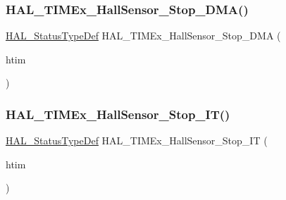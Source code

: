 \subsubsection{\texorpdfstring{H\+A\+L\+\_\+\+T\+I\+M\+Ex\+\_\+\+Hall\+Sensor\+\_\+\+Stop\+\_\+\+D\+M\+A()}{HAL\_TIMEx\_HallSensor\_Stop\_DMA()}}
{\footnotesize\ttfamily \hyperlink{stm32f4xx__hal__def_8h_a63c0679d1cb8b8c684fbb0632743478f}{H\+A\+L\+\_\+\+Status\+Type\+Def} H\+A\+L\+\_\+\+T\+I\+M\+Ex\+\_\+\+Hall\+Sensor\+\_\+\+Stop\+\_\+\+D\+MA (\begin{DoxyParamCaption}\item[{\hyperlink{struct_t_i_m___handle_type_def}{T\+I\+M\+\_\+\+Handle\+Type\+Def} $\ast$}]{htim }\end{DoxyParamCaption})}

\mbox{\label{group___t_i_m_ex___exported___functions___group1_gac6ab7ab0cada425a8d4deb637bd2ad71}} 
\subsubsection{\texorpdfstring{H\+A\+L\+\_\+\+T\+I\+M\+Ex\+\_\+\+Hall\+Sensor\+\_\+\+Stop\+\_\+\+I\+T()}{HAL\_TIMEx\_HallSensor\_Stop\_IT()}}
{\footnotesize\ttfamily \hyperlink{stm32f4xx__hal__def_8h_a63c0679d1cb8b8c684fbb0632743478f}{H\+A\+L\+\_\+\+Status\+Type\+Def} H\+A\+L\+\_\+\+T\+I\+M\+Ex\+\_\+\+Hall\+Sensor\+\_\+\+Stop\+\_\+\+IT (\begin{DoxyParamCaption}\item[{\hyperlink{struct_t_i_m___handle_type_def}{T\+I\+M\+\_\+\+Handle\+Type\+Def} $\ast$}]{htim }\end{DoxyParamCaption})}

